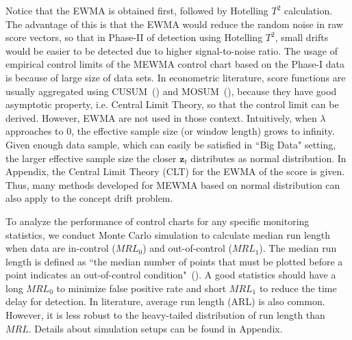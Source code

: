 \documentclass[twoside,11pt]{article}
\begin{document}
Notice that the EWMA is obtained first, followed by Hotelling $T^2$ calculation. The advantage of this is that the EWMA would reduce the random noise in raw score vectors, so that in Phase-II of detection using Hotelling $T^2$, small drifts would be easier to be detected due to higher signal-to-noise ratio. The usage of empirical control limits of the MEWMA control chart based on the Phase-I data is because of large size of data sets. In econometric literature, score functions are usually aggregated using CUSUM~(\cite{zeileis2007generalized}) and MOSUM~(\cite{chu1995mosum}), because they have good asymptotic property, i.e. Central Limit Theory, so that the control limit can be derived. However, EWMA are not used in those context. Intuitively, when $ \lambda$ approaches to $0$, the effective sample size (or window length) grows to infinity. Given enough data sample, which can easily be satisfied in ``Big Data" setting, the larger effective sample size the closer $\bm {z}_t$ distributes as normal distribution. In Appendix, the Central Limit Theory (CLT) for the EWMA of the score is given. Thus, many methods developed for MEWMA based on normal distribution can also apply to the concept drift problem. 

To analyze the performance of control charts for any specific monitoring statistics, we conduct Monte Carlo simulation to calculate median run length when data are in-control ($MRL_0$) and out-of-control ($MRL_1$). The median run length is defined as ``the median number of points that must be plotted before a point indicates an out-of-control condition"~(\cite{montgomery2007introduction}). A good statistics should have a long $MRL_0$ to minimize false positive rate and short $MRL_1$ to reduce the time delay for detection. In literature, average run length (ARL) is also common. However, it is less robust to the heavy-tailed distribution of run length than $MRL$. Details about simulation setups can be found in Appendix. 
\end{document}
